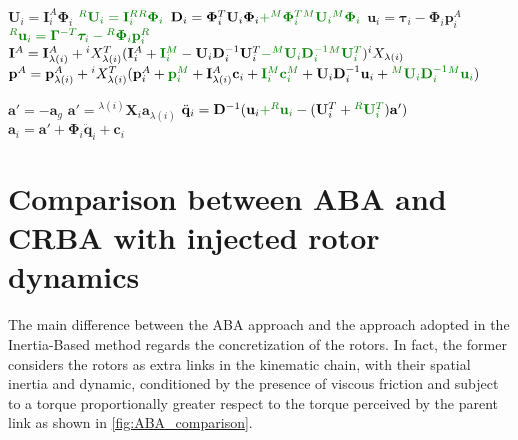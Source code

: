 \begin{algorithm}
\begin{algorithmic}[1]
        \State $\mathbf{U}_i = \mathbf{I}_i ^A \boldsymbol{\Phi}_i$
        \State $\color{webgreen}{{}^R\mathbf{U}_i = \mathbf{I}_i ^R {}^R\boldsymbol{\Phi}_i}$
        \State $\mathbf{D} _i = \boldsymbol{\Phi} ^T _i  {} \mathbf{U} _i \boldsymbol{\Phi} _i \textcolor{webgreen}{+ {} ^M\boldsymbol{\Phi} ^T _i  {} ^M\mathbf{U} _i {} ^M\boldsymbol{\Phi} _i}$
        \State $\mathbf{u}_i = \boldsymbol{\tau}_i - \boldsymbol{\Phi}_i\mathbf{p}_i^A$
        \State $\color{webgreen}{{}^R\mathbf{u}_i = \boldsymbol{\Gamma}^{-T}\boldsymbol{\tau}_i - {}^R\boldsymbol{\Phi}_i\mathbf{p}_i^R}$
        \State $\mathbf{I} ^A = \mathbf{I} ^A _{\lambda (i)} + {} ^i X _{\lambda (i)} ^T (\mathbf{I} _i ^A + \textcolor{webgreen}{\mathbf{I} _i ^M } - {}  \mathbf{U} _i  \mathbf{D} ^{-1} _i  {}  \mathbf{U} ^T _i \textcolor{webgreen}{- {} ^M \mathbf{U} _i  \mathbf{D} ^{-1} _i {} ^M \mathbf{U} ^T _i}) {} ^i X _{\lambda (i)} $
        \State $\mathbf{p} ^A = \mathbf{p} ^A _{\lambda (i)} + {} ^i X _{\lambda (i)} ^T (\mathbf{p} ^A_i + \textcolor{webgreen}{\mathbf{p} ^M_i } + \mathbf{I} ^A _{\lambda (i)}  \mathbf{c}_i + \textcolor{webgreen}{\mathbf{I} {} ^M _i \mathbf{c} ^M _i }+ {}  \mathbf{U} _i \mathbf{D} ^{-1} _i {} \mathbf{u} _i + \textcolor{webgreen}{{} ^M \mathbf{U} _i \mathbf{D} ^{-1} _i {} ^M\mathbf{u} _i}) $
        \EndIf
        \EndFor

        \State $\mathbf{a}' = -\mathbf{a}_g$
        \Else
        \State $\mathbf{a}' = {}^{\lambda(i)}\mathbf{X}_i \mathbf{a}_{\lambda(i)}$
        \State $\ddot{\mathbf{q}}_i = \mathbf{D}^{-1} (\mathbf{u}_i \textcolor{webgreen}{+ {}^R\mathbf{u}_i }- (\mathbf{U}_i^T + \textcolor{webgreen}{{}^R\mathbf{U}_i^T})\mathbf{a}')$
        \State $\mathbf{a}_i = \mathbf{a}' + \boldsymbol{\Phi}_i\mathbf{\ddot{q}}_i + \mathbf{c} _i$
        \EndIf
        \EndFor
    \end{algorithmic}
\end{algorithm}

\section{Comparison between ABA and CRBA with injected rotor dynamics}

The main difference between the \ac{ABA} approach and the approach adopted in the Inertia-Based method regards the concretization of the rotors. In fact, the former considers the rotors as extra links in the kinematic chain, with their spatial inertia and dynamic, conditioned by the presence of viscous friction and subject to a torque proportionally greater respect to the torque perceived by the parent link as shown in \cref{fig:ABA_comparison}.

